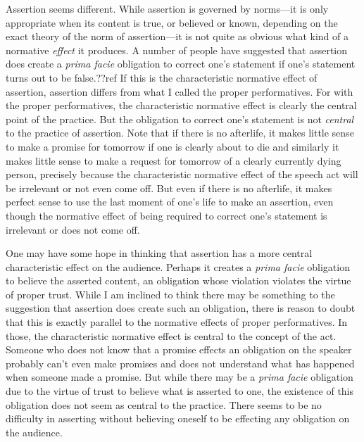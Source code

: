 Assertion seems different. While assertion is governed by norms---it is only appropriate when its content
is true, or believed or known, depending on the exact theory of the norm of assertion---it is not quite as obvious
what kind of a normative \textit{effect} it produces. A number of people have suggested that assertion does create
a \textit{prima facie} obligation to correct one's statement if one's statement turns out to be false.??ref If this is the
characteristic normative effect of assertion, assertion differs from what I called the proper performatives. For with the 
proper performatives, the characteristic normative effect is clearly the central point of the practice. But the 
obligation to correct one's statement is not \textit{central} to the practice of assertion. Note that
if there is no afterlife, it makes little sense to make a promise for tomorrow if one is clearly about to die and 
similarly it makes little sense to make a request for tomorrow of a clearly currently dying person, precisely because
the characteristic normative effect of the speech act will be irrelevant or not even come off. But even if there is 
no afterlife, it makes perfect sense to use the last moment of one's life to make an assertion, even though the
normative effect of being required to correct one's statement is irrelevant or does not come off. 

One may have some hope in thinking that assertion has a more central characteristic effect on the audience.
Perhaps it creates a \textit{prima facie} obligation to believe the asserted content, an obligation whose
violation violates the virtue of proper trust. While I am inclined to think there may be something to the
suggestion that assertion does create such an obligation, there is reason to doubt that this is exactly 
parallel to the normative effects of proper performatives. In those, the characteristic normative effect is central to the concept of the
act. Someone who does not know that a promise effects an obligation on the speaker probably can't even 
make promises and does not understand what has happened when someone made a promise.  But while there may 
be a \textit{prima facie} obligation due to the virtue of trust to believe what is asserted to one, the 
existence of this obligation does not seem as central to the practice. There seems to be no difficulty
in asserting without believing oneself to be effecting any obligation on the audience. 

